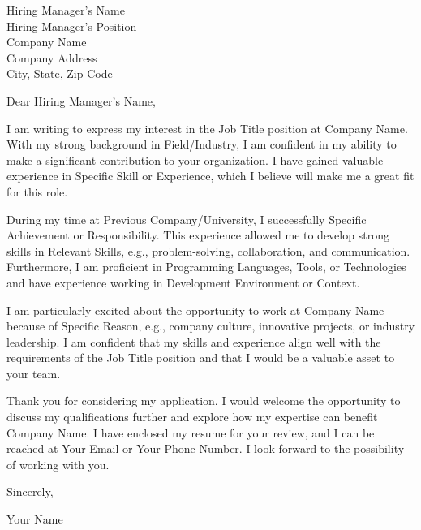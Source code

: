 \documentclass[a4paper,12pt]{article} %
\begin{document}
\vspace{12pt}
\vspace{12pt}

\begin{center}
    Hiring Manager's Name\\
    Hiring Manager's Position\\
    Company Name\\
    Company Address\\
    City, State, Zip Code
\end{center}

\vspace{12pt}
\vspace{12pt}

\begin{center}
    Dear Hiring Manager's Name,
\end{center}

\vspace{12pt}
\vspace{12pt}

I am writing to express my interest in the Job Title position at Company Name. With my strong background in Field/Industry, I am confident in my ability to make a significant contribution to your organization. I have gained valuable experience in Specific Skill or Experience, which I believe will make me a great fit for this role.

During my time at Previous Company/University, I successfully Specific Achievement or Responsibility. This experience allowed me to develop strong skills in Relevant Skills, e.g., problem-solving, collaboration, and communication. Furthermore, I am proficient in Programming Languages, Tools, or Technologies and have experience working in Development Environment or Context.

I am particularly excited about the opportunity to work at Company Name because of Specific Reason, e.g., company culture, innovative projects, or industry leadership. I am confident that my skills and experience align well with the requirements of the Job Title position and that I would be a valuable asset to your team.

Thank you for considering my application. I would welcome the opportunity to discuss my qualifications further and explore how my expertise can benefit Company Name. I have enclosed my resume for your review, and I can be reached at Your Email or Your Phone Number. I look forward to the possibility of working with you.

\vspace{12pt}

Sincerely,

Your Name
\end{document}

